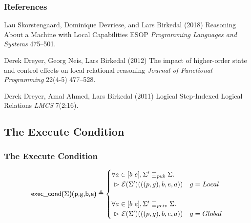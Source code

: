 \documentclass{beamer}
\newcommand{\interp}[2]{(#1)(#2)}
\begin{document}

\begin{frame}
\frametitle{References}
\footnotesize{
\begin{thebibliography}{99} %
 Lau Skorstengaard, 
Dominique Devriese, 
and Lars Birkedal (2018)
\newblock Reasoning About a Machine with Local Capabilities
\newblock ESOP \emph{Programming Languages and Systems} 475--501.

 Derek Dreyer, Georg Neis, Lars Birkedal (2012)
\newblock The impact of higher-order state and control effects on local relational reasoning
\newblock \emph{Journal of Functional Programming} 22(4-5) 477--528.

 Derek Dreyer, Amal Ahmed, Lars Birkedal (2011)
\newblock Logical Step-Indexed Logical Relations
\newblock \emph{LMCS} 7(2:16).

\end{thebibliography}
}
\end{frame}

\subsection{The Execute Condition}

\begin{frame}
\frametitle{The Execute Condition}

\begin{equation*}
\textsf{exec\_cond($\Sigma$)(\textsf{p,g,b,e})} \triangleq \begin{cases}
\forall a \in [b~e], \Sigma ' \sqsupseteq_{pub} \Sigma.\\
~\rhd~\mathcal{E}\interp{\Sigma '}{((p,g),b,e,a)} &g = Local\\ \\
\forall a \in [b~e], \Sigma ' \sqsupseteq_{priv} \Sigma.\\
~\rhd~\mathcal{E}\interp{\Sigma '}{((p,g),b,e,a)} &g = Global\\
\end{cases}
\end{equation*}

\end{frame}
\end{document}
